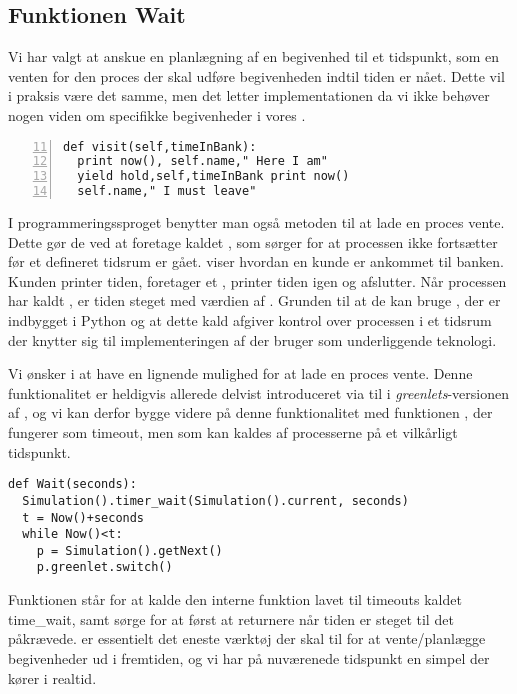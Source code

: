 \subsection{Funktionen Wait}\label{sec:Wait}
Vi har valgt at anskue en planlægning af en begivenhed til et tidspunkt, som en venten for den proces der skal udføre begivenheden indtil tiden er nået. Dette vil i praksis være det samme, men det letter implementationen da vi ikke behøver nogen viden om specifikke begivenheder i vores \sched. 

\begin{lstlisting}[firstnumber=11 , stepnumber=2, numbers=left,float=hbtp, label=fig:simpy:yield, caption= Et yield i \simpy (Taget fra Bank05.py i eksemplet fra \simpy)] 
def visit(self,timeInBank): 
  print now(), self.name," Here I am" 
  yield hold,self,timeInBank print now()
  self.name," I must leave" 
\end{lstlisting}
I programmeringssproget \simpy benytter man også metoden til at lade en proces vente. Dette gør de ved at
foretage kaldet , som sørger for at processen ikke
fortsætter før et defineret tidsrum er gået.  viser hvordan en kunde er ankommet til banken. Kunden printer tiden, foretager et , printer tiden igen og afslutter.  Når processen har kaldt , er tiden steget med værdien af . Grunden til at de kan bruge , der er indbygget i Python og at dette kald afgiver kontrol over processen i et tidsrum der knytter sig til implementeringen af \simpy der bruger   som underliggende teknologi. 

 Vi ønsker i \pycsp at have en lignende mulighed for at lade en proces vente. Denne funktionalitet er heldigvis allerede delvist introduceret via  til  i \emph{greenlets}-versionen af \pycsp, og vi kan derfor bygge videre på denne funktionalitet med funktionen , der fungerer som timeout, men som kan kaldes af processerne
på et vilkårligt tidspunkt.
\begin{lstlisting}[firstnumber=20,float=hbtp, label=fig:wait, caption=Wait i \code{simulering}-versionen.] 
def Wait(seconds):
  Simulation().timer_wait(Simulation().current, seconds)
  t = Now()+seconds
  while Now()<t:
    p = Simulation().getNext() 
    p.greenlet.switch()
\end{lstlisting}

Funktionen  står for at kalde den interne funktion lavet til timeouts kaldet time\_wait, samt sørge for at først at returnere når tiden er steget til det påkrævede.  er essentielt det eneste værktøj der skal til for at vente/planlægge begivenheder ud i fremtiden, og vi har på nuværenede tidspunkt en simpel \des der kører i realtid. 

